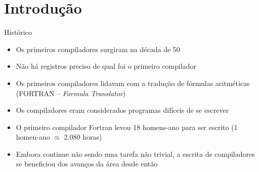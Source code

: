\section{Introdução}

\begin{frame}[fragile]{Histórico}

    \begin{itemize}
        \item Os primeiros compiladores surgiram na década de 50
        \pause

        \item Não há registros preciso de qual foi o primeiro compilador
        \pause

        \item Os primeiros compiladores lidavam com a tradução de fórmulas aritméticas (FORTRAN -- \textit{Formula Translator})
        \pause

        \item Os compiladores eram considerados programas difíceis de se escrever
        \pause

        \item O primeiro compilador Fortran levou 18 homens-ano para ser escrito (1 homen-ano $\approx$ 2.080 horas)
        \pause

        \item Embora continue não sendo uma tarefa não trivial, a escrita de compiladores se beneficiou dos avanços da área desde então
    \end{itemize}

\end{frame}


